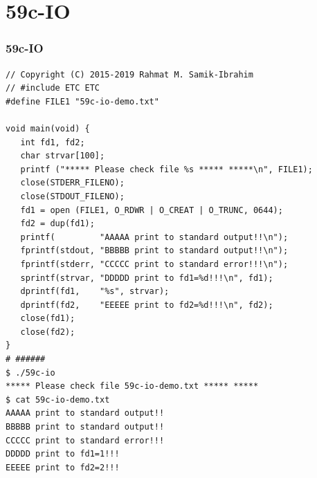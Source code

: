 \documentclass[aspectratio=169, xcolor=table, notheorems, hyperref={pdfpagelabels=false}]{beamer}
\begin{document}
\section{59c-IO}
\begin{frame}[fragile]
\frametitle{59c-IO}
\begin{lstlisting}[basicstyle=\ttfamily\tiny]
// Copyright (C) 2015-2019 Rahmat M. Samik-Ibrahim
// #include ETC ETC
#define FILE1 "59c-io-demo.txt"

void main(void) {
   int fd1, fd2;
   char strvar[100];
   printf ("***** Please check file %s ***** *****\n", FILE1);
   close(STDERR_FILENO);
   close(STDOUT_FILENO);
   fd1 = open (FILE1, O_RDWR | O_CREAT | O_TRUNC, 0644);
   fd2 = dup(fd1);
   printf(         "AAAAA print to standard output!!\n"); 
   fprintf(stdout, "BBBBB print to standard output!!\n"); 
   fprintf(stderr, "CCCCC print to standard error!!!\n");
   sprintf(strvar, "DDDDD print to fd1=%d!!!\n", fd1);
   dprintf(fd1,    "%s", strvar);
   dprintf(fd2,    "EEEEE print to fd2=%d!!!\n", fd2);
   close(fd1);
   close(fd2);
}
# ######
$ ./59c-io 
***** Please check file 59c-io-demo.txt ***** *****
$ cat 59c-io-demo.txt 
AAAAA print to standard output!!
BBBBB print to standard output!!
CCCCC print to standard error!!!
DDDDD print to fd1=1!!!
EEEEE print to fd2=2!!!

\end{lstlisting}
\end{frame}
\end{document}
